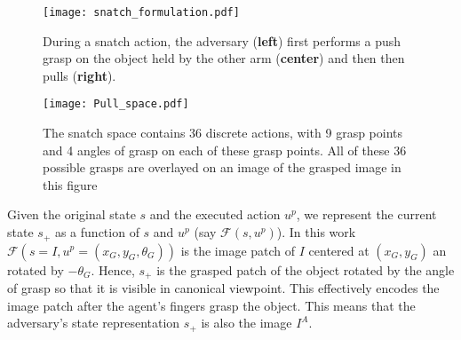 \documentclass[letterpaper, 10 pt, conference]{ieeeconf}  %
\begin{document}
\begin{figure}[t!]
\begin{center}
\texttt{[image: snatch\_formulation.pdf]}
\end{center}
\caption{During a snatch action, the adversary (\textbf{left}) first performs a push grasp on the object held by the other arm (\textbf{center}) and then then pulls (\textbf{right}).}
\label{fig:pull_formulation}
\end{figure}\begin{figure}[t!]
\begin{center}
\texttt{[image: Pull\_space.pdf]}
\end{center}
\caption{The snatch space contains 36 discrete actions, with 9 grasp points and 4 angles of grasp on each of these grasp points. All of these 36 possible grasps are overlayed on an image of the grasped image in this figure}
\label{fig:pull_space}
\end{figure}%
 Given the original state $s$ and the executed action $u^p$, we represent the current state $s_+$ as a function of $s$ and $u^p$ (say $\mathcal{F}(s,u^p)$). In this work $\mathcal{F}(s=I,u^p=(x_G,y_G,\theta_G))$ is the image patch of $I$ centered at $(x_G,y_G)$ an rotated by $-\theta_G$. Hence, $s_+$ is the grasped patch of the object rotated by the angle of grasp so that it is visible in canonical viewpoint. This effectively encodes the image patch after the agent's fingers grasp the object. This means that the adversary's state representation $s_+$ is also the image $I^A$.
\end{document}
